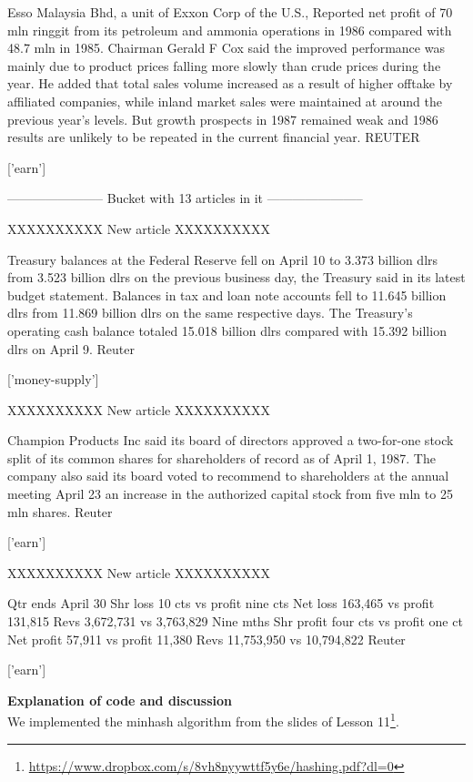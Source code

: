 \documentclass{article}
\begin{document}
\begin{pythonOutput}
Esso Malaysia Bhd, a unit of Exxon
Corp of the U.S., Reported net profit of 70 mln ringgit from
its petroleum and ammonia operations in 1986 compared with 48.7
mln in 1985. Chairman Gerald F Cox said the improved
performance was mainly due to product prices falling more
slowly than crude prices during the year.
    He added that total sales volume increased as a result of
higher offtake by affiliated companies, while inland market
sales were maintained at around the previous year's levels.
    But growth prospects in 1987 remained weak and 1986 results
are unlikely to be repeated in the current financial year.
 REUTER

['earn']

-----------------------
Bucket with 13 articles in it
-----------------------


XXXXXXXXXX
New article
XXXXXXXXXX

Treasury balances at the Federal
Reserve fell on April 10 to 3.373 billion dlrs from 3.523
billion dlrs on the previous business day, the Treasury said in
its latest budget statement.
    Balances in tax and loan note accounts fell to 11.645
billion dlrs from 11.869 billion dlrs on the same respective
days.
    The Treasury's operating cash balance totaled 15.018
billion dlrs compared with 15.392 billion dlrs on April 9.
 Reuter

['money-supply']

XXXXXXXXXX
New article
XXXXXXXXXX

Champion Products Inc said its
board of directors approved a two-for-one stock split of its
common shares for shareholders of record as of April 1, 1987.
    The company also said its board voted to recommend to
shareholders at the annual meeting April 23 an increase in the
authorized capital stock from five mln to 25 mln shares.
 Reuter

['earn']

XXXXXXXXXX
New article
XXXXXXXXXX

Qtr ends April 30
    Shr loss 10 cts vs profit nine cts
    Net loss 163,465 vs profit 131,815
    Revs 3,672,731 vs 3,763,829
    Nine mths
    Shr profit four cts vs profit one ct
    Net profit 57,911 vs profit 11,380
    Revs 11,753,950 vs 10,794,822
 Reuter

['earn']

\end{pythonOutput}
\textbf{Explanation of code and discussion}\\
We implemented the minhash algorithm from the slides of Lesson 11\footnote{\url{https://www.dropbox.com/s/8vh8nyywttf5y6e/hashing.pdf?dl=0}}.\\
\end{document}
